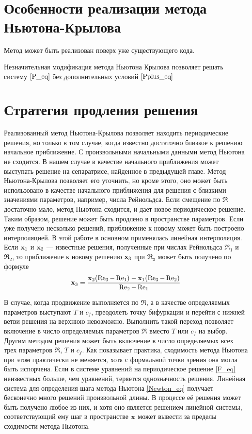 \section{Особенности реализации метода Ньютона-Крылова}

Метод может быть реализован поверх уже существующего кода. 

Незначительная модификация метода Ньютона Крылова позволяет решать систему $\eqref{P_eq}$ без дополнительных условий $\eqref{Pplus_eq}$ 


\section{Стратегия продления решения}

Реализованный метод Ньютона-Крылова позволяет находить периодические решения, но только в том случае, когда известно достаточно близкое к решению начальное приближение. С произвольными начальными данными метод Ньютона не сходится. В нашем случае в качестве начального приближения может выступать решение на сепаратрисе, найденное в предыдущей главе. Метод Ньютона-Крылова позволяет его уточнить, но кроме этого, оно может быть использовано в качестве начального приближения для решения с близкими значениями параметров, например, числа Рейнольдса. Если смещение по $\Re$ достаточно мало, метод Ньютона сходится, и дает новое периодическое решение. Таким образом, решение может быть продлено в пространстве параметров. Если уже получено несколько решений, приближение к новому может быть построено интерполяцией. В этой работе в основном применялась линейная интерполяция. Если $\mathbf{x}_1$ и $\mathbf{x}_2$ --- известные решения, полученные при числах Рейнольдса $\Re_1$ и $\Re_2$, то приближение к новому решению $\mathbf{x}_3$ при $\Re_3$ может быть получено по формуле 
\begin{equation}
\mathbf{x}_3 = \frac{\mathbf{x}_2(\operatorname{Re}_3 - \operatorname{Re}_1) - \mathbf{x}_1(\operatorname{Re}_3-\operatorname{Re}_2)}{\operatorname{Re}_2 - \operatorname{Re}_1}
\end{equation}

В случае, когда продвижение выполняется по $\Re$, а в качестве определяемых параметров выступают $T$ и $c_f$, преодолеть точку бифуркации и перейти с нижней ветви решения на верхнюю невозможно. Выполнить такой переход позволяет включение в число определяемых параметров $\Re$ вместо $T$ или $c_f$ на выбор. Другим методом решения может быть включение в число определяемых всех трех параметров $\Re$, $T$ и $c_f$. Как показывает практика, сходимость метода Ньютона при этом практически не меняется, хотя с формальной точки зрения она могла быть испорчена. Если в системе уравнений на периодическое решение \eqref{F_eq} неизвестных больше, чем уравнений, теряется однозначность решения. Линейная система для определения шага метода Ньютона \eqref{Newton_eq} получает бесконечно много решений произвольной длины. В процессе её решения может быть получено любое из них, и хотя оно является решением линейной системы, соответствующий ему шаг в пространстве $\mathbf{x}$ может вывести за пределы сходимости метода Ньютона. 


